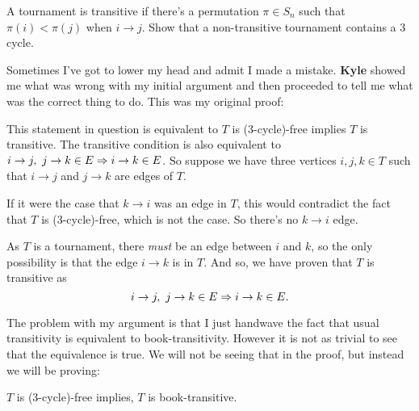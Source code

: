 \documentclass[12pt]{memoir}
\begin{document}
\begin{Ej}
    A tournament is transitive if there's a permutation $\pi\in S_n$ such that $\pi(i)<\pi(j)$ when $i\to j$. Show that a non-transitive tournament contains a 3 cycle. 
\end{Ej}

Sometimes I've got to lower my head and admit I made a mistake. \textbf{Kyle} showed me what was wrong with my initial argument and then proceeded to tell me what was the correct thing to do. This was my original proof:
\iffalse
Triangle-free graphs are so \emph{fun}, the first result I saw in graph theory was Mantel's theorem. I still remember that class very vividly, my professor asked us for examples of $K_3$-free graphs and the best I could come up with was a path graph. Eventually other people came up with bipartite graphs and then he stated, ``\emph{The most edges that a $K_3$-graph can have is $n^2/4$ and the extremal graph is $K_{n/2,n/2}$.}''\par 
It is not the same case for directed graphs but still, this problem is related to triangle-free graphs. 
\fi
\begin{ptcb}
    This statement in question is equivalent to $T$ is (3-cycle)-free implies $T$ is transitive. The transitive condition is also equivalent to $i\to j,\ j\to k\in E\Rightarrow i\to k\in E$. So suppose we have three vertices $i,j,k\in T$ such that $i\to j$ and $j\to k$ are edges of $T$.\par 
    If it were the case that $k\to i$ was an edge in $T$, this would contradict the fact that $T$ is (3-cycle)-free, which is not the case. So there's no $k\to i$ edge.\par 
    As $T$ is a tournament, there \emph{must} be an edge between $i$ and $k$, so the only possibility is that the edge $i\to k$ is in $T$. And so, we have proven that $T$ is transitive as 
    $$i\to j,\ j\to k\in E\Rightarrow i\to k\in E.$$
\end{ptcb}

The problem with my argument is that I just handwave the fact that usual transitivity is equivalent to book-transitivity. However it is not as trivial to see that the equivalence is true. We will not be seeing that in the proof, but instead we will be proving: 
\begin{significant}
$T$ is (3-cycle)-free implies, $T$ is book-transitive.
\end{significant}
\end{document}
